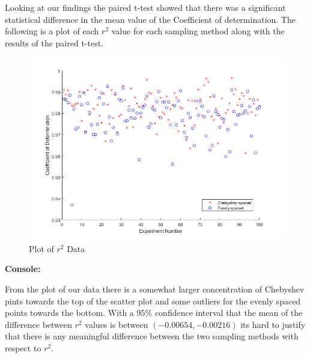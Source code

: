 \documentclass[12pt]{article}
\theoremstyle{homework}
\begin{document}
  Looking at our findings the paired t-test showed that there was a significant statistical difference in the mean value of the Coefficient of determination. The following is a plot of 
  each $r^2$ value for each sampling method along with the results of the paired t-test.\\ 
  \begin{figure}[H]
    \caption{Plot of $r^2$ Data}
    \includegraphics[width = \textwidth]{r2_data.png}  
    \centering
  \end{figure}
  \textbf{Console:}
  \begin{center}
  
  \end{center}
  
  From the plot of our data there is a somewhat larger concentration of Chebyshev pints towards the top of the scatter plot and some outliers 
  for the evenly spaced points towards the bottom. With a $95\%$ confidence interval that the mean of the difference between $r^2$ values is between $(-0.00654, -0.00216)$
  its hard to justify that there is any meaningful difference between the two sampling methods with respect to $r^2$. 
  \\\\
\end{document}
